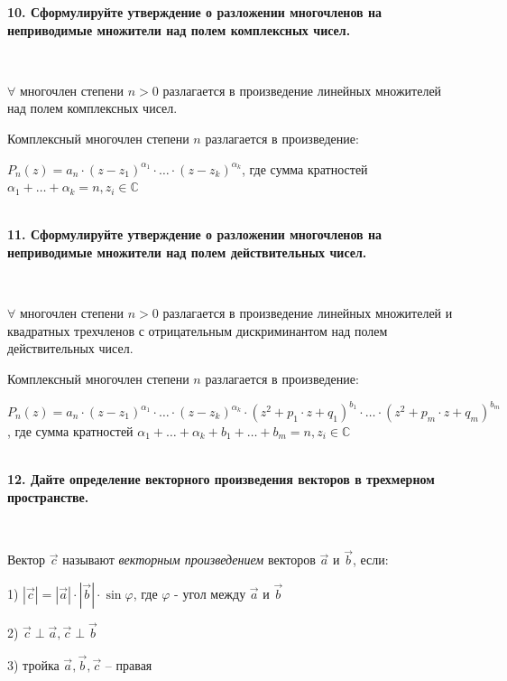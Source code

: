 \documentclass{article}
\begin{document}
    \textbf{10. Сформулируйте утверждение о разложении многочленов на неприводимые множители над полем комплексных чисел.}

    {
        $\;$
        \setlength{\parindent}{0.4cm}
        \hangindent=0.4cm

        $\forall$ многочлен степени $n>0$ разлагается в произведение линейных множителей над полем комплексных чисел.

    Комплексный многочлен степени $n$ разлагается в произведение:

        $P_n(z)=a_n\cdot(z-z_1)^{\alpha_1}\cdot \ldots\cdot(z-z_k)^{\alpha_k}$, где сумма кратностей $\alpha_1+\ldots+\alpha_k=n, z_i\in\mathbb{C}$\\

        $\;$
        \setlength{\parindent}{0cm}
        \hangindent=0cm
    }

    \textbf{11. Сформулируйте утверждение о разложении многочленов на неприводимые множители над полем действительных чисел.}

    {
        $\;$
        \setlength{\parindent}{0.4cm}
        \hangindent=0.4cm

        $\forall$ многочлен степени $n>0$ разлагается в произведение линейных множителей и квадратных трехчленов с отрицательным дискриминантом над полем действительных чисел.

    Комплексный многочлен степени $n$ разлагается в произведение:

        $P_n(z)=a_n\cdot(z-z_1)^{\alpha_1}\cdot \ldots\cdot(z-z_k)^{\alpha_k}\cdot(z^2 + p_1 \cdot z + q_1)^{b_1}\cdot\ldots\cdot(z^2 + p_m \cdot z + q_m)^{b_m}$, где сумма кратностей $\alpha_1+\ldots+\alpha_k+b_1+\ldots+b_m=n, z_i\in\mathbb{C}$\\

        $\;$
        \setlength{\parindent}{0cm}
        \hangindent=0cm
    }

    \textbf{12. Дайте определение векторного произведения векторов в трехмерном пространстве.}

    {
        $\;$
        \setlength{\parindent}{0.4cm}
        \hangindent=0.4cm

    Вектор $\overrightarrow{c}$ называют \textit{векторным произведением} векторов $\overrightarrow{a}$ и $\overrightarrow{b}$, если:

    1) $|\overrightarrow{c}|=|\overrightarrow{a}|\cdot|\overrightarrow{b}|\cdot\sin\varphi$, где $\varphi$ - угол между $\overrightarrow{a}$ и $\overrightarrow{b}$

        2) $\overrightarrow{c}\perp\overrightarrow{a}, \overrightarrow{c}\perp\overrightarrow{b}$

        3) тройка $\overrightarrow{a}, \overrightarrow{b}, \overrightarrow{c}$ -- правая

        $\;$
        \setlength{\parindent}{0cm}
        \hangindent=0cm
    }
\end{document}
